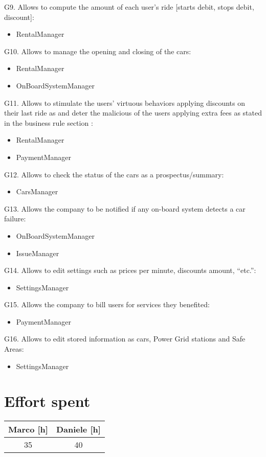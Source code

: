 \documentclass{scrreprt}
\begin{document}
G9. Allows to compute the amount of each user's ride [starts debit, stops debit, discount]:
\begin{itemize}
\item RentalManager
\end{itemize}
G10. Allows to manage the opening and closing of the cars:
\begin{itemize}
\item RentalManager
\item OnBoardSystemManager
\end{itemize}
G11. Allows to stimulate the users’ virtuous behaviors applying discounts on their last ride as and deter the malicious of the users applying extra fees as stated in the business rule section :
\begin{itemize}
\item RentalManager
\item PaymentManager
\end{itemize}
G12. Allows to check the status of the cars as a prospectus/summary:
\begin{itemize}
\item CarsManager
\end{itemize}
G13. Allows the company to be notified if any on-board system detects a car failure:
\begin{itemize}
\item OnBoardSystemManager
\item IssueManager
\end{itemize}
G14. Allows to edit settings such as prices per minute, discounts amount, “etc.”:
\begin{itemize}
\item SettingsManager
\end{itemize}
G15. Allows the company to bill users for services they benefited:
\begin{itemize}
\item PaymentManager
\end{itemize}
G16. Allows to edit stored information as cars, Power Grid stations and Safe Areas:
\begin{itemize}
\item SettingsManager
\end{itemize}


\chapter{Effort spent}

\begin{center}
    \begin{tabular}{cc}
        \toprule
	   \textbf{ Marco [h]  }& \textbf{ Daniele [h] }\\
	   \midrule
        35&40\\
	\bottomrule
    \end{tabular}
\end{center}
\end{document}
